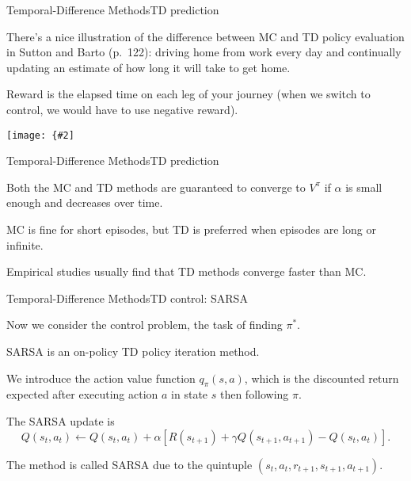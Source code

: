 \documentclass{beamer}
\newcommand{\myfig}[3]{\centerline{\texttt{[image: \{\#2]}}}
    \centerline{\scriptsize #3}}
\begin{document}
\begin{frame}{Temporal-Difference Methods}{TD prediction}

  There's a nice illustration of the difference between MC and TD
  policy evaluation in Sutton and Barto (p.\ 122): driving home from
  work every day and continually updating an estimate of how long it
  will take to get home.

  \medskip

  Reward is the elapsed time on each leg of your journey (when we
  switch to control, we would have to use negative reward).

  \medskip
  
  \myfig{4in}{sutton-fig6-1}{Sutton and Barto (2018), Figure 6.1:
  MC (left) vs.\ TD (right).}
  
\end{frame}


\begin{frame}{Temporal-Difference Methods}{TD prediction}

  Both the MC and TD methods are \alert{guaranteed to converge} to $V^\pi$
  if $\alpha$ is small enough and decreases over time.

  \medskip

  MC is fine for short episodes, but TD is preferred when episodes
  are long or infinite.

  \medskip

  Empirical studies usually find that TD methods converge faster than
  MC.
  
\end{frame}


\begin{frame}{Temporal-Difference Methods}{TD control: SARSA}

  Now we consider the \alert{control} problem, the task of finding $\pi^*$.

  \medskip

  SARSA is an \alert{on-policy} TD policy iteration method.

  \medskip

  We introduce the \alert{action value function} $q_\pi(s,a)$, which
  is the discounted return expected after executing action $a$ in state $s$ then
  following $\pi$.

  \medskip

  The SARSA update is
  $$Q(s_t,a_t) \leftarrow Q(s_t,a_t) + \alpha\left[ R(s_{t+1}) + \gamma
    Q(s_{t+1},a_{t+1}) - Q(s_t,a_t) \right]. $$

  The method is called SARSA due to the quintuple $(s_t, a_t, r_{t+1},
  s_{t+1}, a_{t+1})$.
  
\end{frame}
\end{document}
